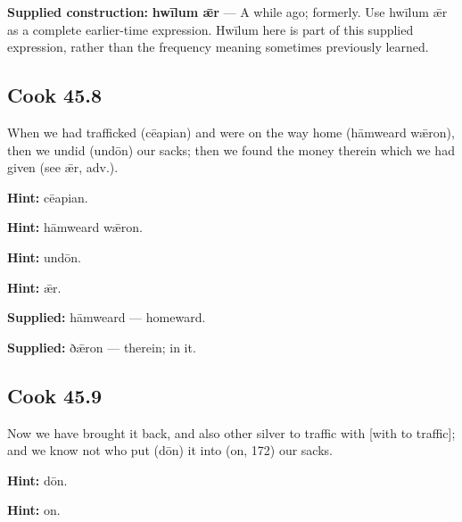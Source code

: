 \textbf{Supplied construction:} \textbf{hwīlum ǣr} — A while ago; formerly. Use hwīlum ǣr as a complete earlier-time expression. Hwīlum here is part of this supplied expression, rather than the frequency meaning sometimes previously learned.

\par\begin{minipage}{\linewidth}\raggedright
\subsection*{Cook 45.8}

When we had trafficked (cēapian) and were on the way home (hāmweard wǣron), then we undid (undōn) our sacks; then we found the money therein which we had given (see ǣr, adv.).

\textbf{Hint:} cēapian.

\textbf{Hint:} hāmweard wǣron.

\textbf{Hint:} undōn.

\textbf{Hint:} ǣr.

\end{minipage}\par\addvspace{4pt}

\textbf{Supplied:} hāmweard — homeward.

\textbf{Supplied:} ðǣron — therein; in it.

\par\begin{minipage}{\linewidth}\raggedright
\subsection*{Cook 45.9}

Now we have brought it back, and also other silver to traffic with [with to traffic]; and we know not who put (dōn) it into (on, 172) our sacks.

\textbf{Hint:} dōn.

\textbf{Hint:} on.

\end{minipage}\par\addvspace{4pt}


